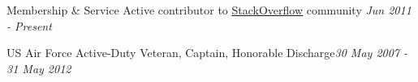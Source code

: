 
\begin{rSection}{Membership \& Service}
  Active contributor to 
  \href{http://stackoverflow.com/users/822162/clayton-stanley}{\uline{StackOverflow}}
  community \hfill {\em Jun 2011 - Present}
\item US Air Force Active-Duty Veteran, Captain, Honorable Discharge\hfill {\em 30 May 2007 - 31 May 2012}
\end{rSection}

